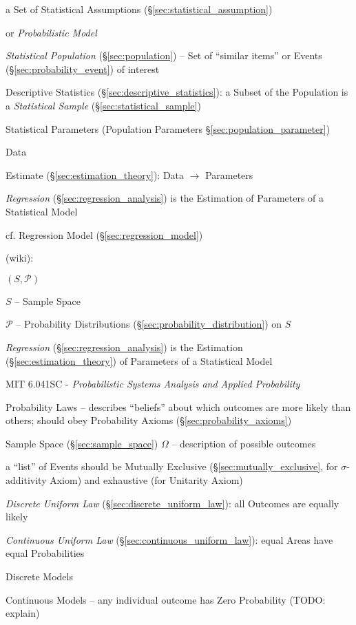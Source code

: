 a Set of Statistical Assumptions (\S\ref{sec:statistical_assumption})

or \emph{Probabilistic Model}

\emph{Statistical Population} (\S\ref{sec:population}) -- Set of ``similar
items'' or Events (\S\ref{sec:probability_event}) of interest

\fist Descriptive Statistics (\S\ref{sec:descriptive_statistics}): a Subset of
the Population is a \emph{Statistical Sample} (\S\ref{sec:statistical_sample})

Statistical Parameters (Population Parameters \S\ref{sec:population_parameter})

Data

Estimate (\S\ref{sec:estimation_theory}): Data $\rightarrow$ Parameters

\emph{Regression} (\S\ref{sec:regression_analysis}) is the Estimation of
Parameters of a Statistical Model

cf. Regression Model (\S\ref{sec:regression_model})

(wiki):

$(S, \mathcal{P})$

$S$ -- Sample Space

$\mathcal{P}$ -- Probability Distributions
(\S\ref{sec:probability_distribution}) on $S$

\emph{Regression} (\S\ref{sec:regression_analysis}) is the Estimation
(\S\ref{sec:estimation_theory}) of Parameters of a Statistical Model

\asterism

MIT 6.041SC - \emph{Probabilistic Systems Analysis and Applied Probability}

Probability Laws -- describes ``beliefs'' about which outcomes are more likely
than others; should obey Probability Axioms (\S\ref{sec:probability_axioms})

Sample Space (\S\ref{sec:sample_space}) $\Omega$ -- description of possible
outcomes

a ``list'' of Events should be Mutually Exclusive
(\S\ref{sec:mutually_exclusive}, for $\sigma$-additivity Axiom) and exhaustive
(for Unitarity Axiom)

\emph{Discrete Uniform Law} (\S\ref{sec:discrete_uniform_law}): all Outcomes are
equally likely

\emph{Continuous Uniform Law} (\S\ref{sec:continuous_uniform_law}): equal Areas
have equal Probabilities

Discrete Models

Continuous Models -- any individual outcome has Zero Probability (TODO: explain)

